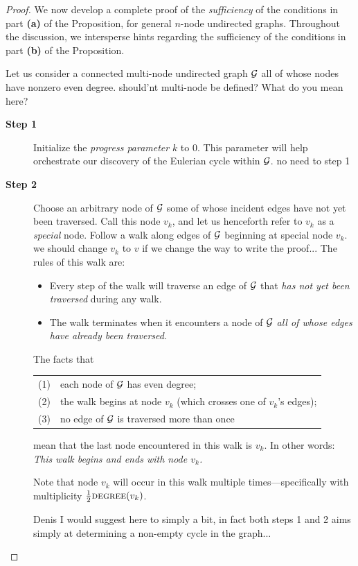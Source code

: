 \begin{proof}
We now develop a complete proof of the {\em sufficiency} of the
conditions in part {\bf (a)} of the Proposition, for general $n$-node
undirected graphs.  Throughout the discussion, we intersperse hints
regarding the sufficiency of the conditions in part {\bf (b)} of the
Proposition.

Let us consider a connected multi-node undirected graph $\mbox{$\cal G$}$ all of
whose nodes have nonzero even degree.
{\Denis  should'nt multi-node be defined? What do you mean here?}

\begin{description}
\item[{\bf Step 1}]
Initialize the {\it progress parameter} $k$ to $0$.  This parameter
will help orchestrate our discovery of the Eulerian cycle within $\mbox{$\cal G$}$.
{\Denis no need to step 1}

\item[{\bf Step 2}]
Choose an arbitrary node of $\mbox{$\cal G$}$ some of whose incident edges have not
yet been traversed.  Call this node $v_k$, and let us henceforth refer
to $v_k$ as a {\em special} node.  Follow a walk along edges of $\mbox{$\cal G$}$
beginning at special node $v_k$.  
{\Denis we should change $v_k$ to $v$ if we change the way to write the proof...}
The rules of this walk are:
\begin{itemize}
\item
Every step of the walk will traverse an edge of $\mbox{$\cal G$}$ that {\em has not
  yet been traversed} during any walk.
\item
The walk terminates when it encounters a node of $\mbox{$\cal G$}$ {\em all of
  whose edges have already been traversed}.
\end{itemize}
The facts that 

\hspace*{.25in}\begin{tabular}{ll}
(1) & each node of $\mbox{$\cal G$}$ has even degree; \\
(2) & the walk begins at node $v_k$ (which crosses one of $v_k$'s edges); \\
(3) & no edge of $\mbox{$\cal G$}$ is traversed more than once
\end{tabular}

\noindent
mean that the last node encountered in this walk is $v_k$.  In other
words: {\em This walk begins and ends with node $v_k$.}

Note that node $v_k$ will occur in this walk multiple
times---specifically with multiplicity $\frac{1}{2} \mbox{\sc
  degree}(v_k)$.
  
{\Denis Denis I would suggest here to simply a bit, in fact both  steps 1 and 2 aims simply at determining a non-empty cycle in the graph...}


\end{description}
\end{proof}
